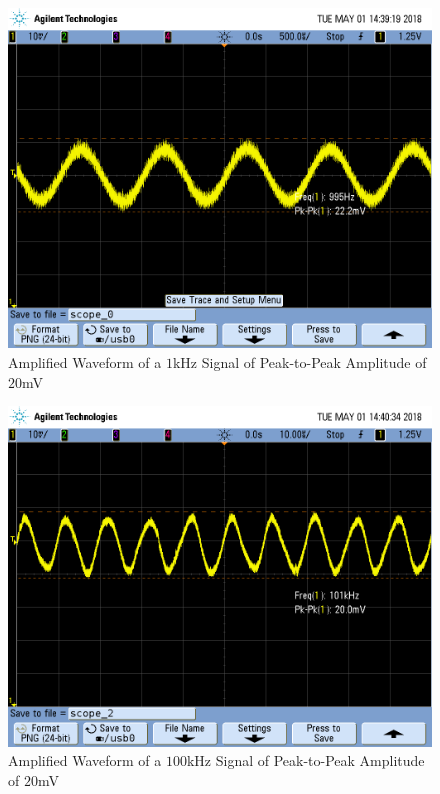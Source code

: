 \begin{figure}[h!]
	\centering
	\includegraphics[scale=0.45]{./images/SCOPE_0.PNG}
	\caption{Amplified Waveform of a $1$\si{\kilo\hertz} Signal of Peak-to-Peak Amplitude of $20$\si{\milli\volt}}
	\label{fig:SCOPE_0}
\end{figure}

\FloatBarrier

\begin{figure}[h!]
	\centering
	\includegraphics[scale=0.45]{./images/SCOPE_2.PNG}
	\caption{Amplified Waveform of a $100$\si{\kilo\hertz} Signal of Peak-to-Peak Amplitude of $20$\si{\milli\volt}}
	\label{fig:SCOPE_2}
\end{figure}

